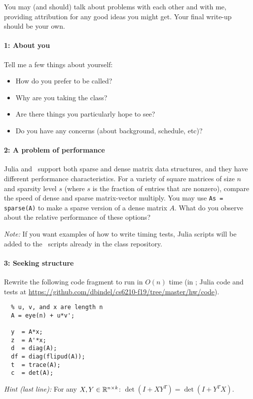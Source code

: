 \documentclass[12pt, leqno]{article} %
\begin{document}

You may (and should) talk about problems with each other and with me,
providing attribution for any good ideas you might get.  Your final
write-up should be your own.

\paragraph*{1: About you}
Tell me a few things about yourself:
\begin{itemize}
\item How do you prefer to be called?
\item Why are you taking the class?
\item Are there things you particularly hope to see?
\item Do you have any concerns (about background, schedule, etc)?
\end{itemize}

\paragraph*{2: A problem of performance}
Julia and \matlab\ support both sparse and dense matrix data structures,
and they have different performance characteristics.  For a variety
of square matrices of size $n$ and sparsity level $s$ (where $s$ is
the fraction of entries that are nonzero), compare the speed of dense
and sparse matrix-vector multiply.  You may use {\tt As = sparse(A)}
to make a sparse version of a dense matrix $A$.  What do you observe
about the relative performance of these options?

{\em Note:} If you want examples of how to write timing tests, Julia
scripts will be added to the \matlab\ scripts already in the class
repository.

\paragraph*{3: Seeking structure}
Rewrite the following code fragment to run in $O(n)$ time
(in \matlab; Julia code and tests at \url{https://github.com/dbindel/cs6210-f19/tree/master/hw/code}).
\begin{lstlisting}
  % u, v, and x are length n
  A = eye(n) + u*v';
  
  y  = A*x;
  z  = A'*x;
  d  = diag(A);
  df = diag(flipud(A));
  t  = trace(A);
  c  = det(A);
\end{lstlisting}

{\em Hint (last line):} For any $X, Y \in \mathbb{R}^{n \times k}$:
$\det(I+XY^T) = \det(I+Y^T X)$.
\end{document}
